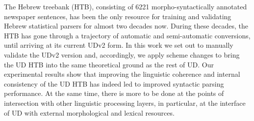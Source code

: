 The Hebrew treebank (HTB),  consisting of  6221 morpho-syntactically annotated newspaper sentences, has been  the  only resource  for training and validating  Hebrew statistical  parsers  for almost two decades now. During these decades, the HTB  has  gone through a  trajectory  of automatic and semi-automatic conversions, until arriving at its  current UDv2 form. In this work we set out to manually validate the  UDv2 version and, accordingly,  we apply  scheme changes  to bring the UD HTB into the same theoretical ground as the rest of UD. Our experimental results show that improving the linguistic coherence and internal consistency of the UD HTB has indeed  led to improved  syntactic parsing  performance. At the same time, there is  more to be done at the points of intersection  with other linguistic processing layers, in particular, at the interface of UD with external morphological and lexical resources.

